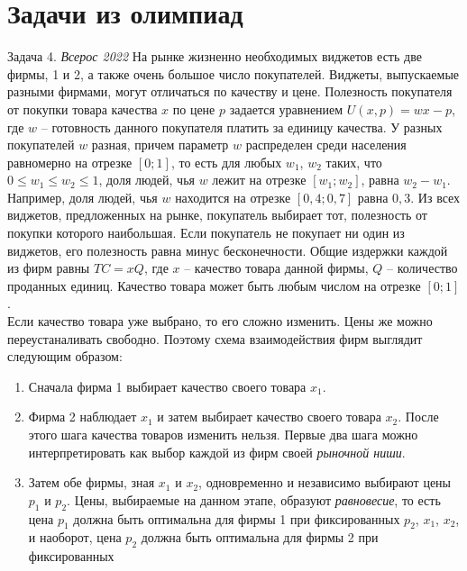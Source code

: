 \section{Задачи из олимпиад}

\begin{mybox}{Задача 4. \textit{Всерос 2022}}
    \indent\setlength{\parindent}{1em}\indent\setlength{\parindent}{1em}На рынке жизненно необходимых виджетов есть две
    фирмы, 1 и 2, а также очень большое число покупателей. Виджеты, выпускаемые разными фирмами, могут отличаться по
    качеству и цене. Полезность покупателя от покупки товара качества $x$ по цене $p$ задается уравнением
    $U(x,p)=wx-p$, где $w$ – готовность данного покупателя платить за единицу качества. У разных покупателей $w$
    разная, причем параметр $w$ распределен среди населения равномерно на отрезке $[0; 1]$, то есть для любых $w_1$,
    $w_2$ таких, что $0\leq w_1 \leq w_2 \leq 1$, доля людей, чья $w$ лежит на отрезке $[w_1;w_2]$, равна $w_2 - w_1$.
    Например, доля людей, чья $w$ находится на отрезке $[0,4; 0,7]$ равна $0,3$. Из всех виджетов, предложенных на
    рынке, покупатель выбирает тот, полезность от покупки которого наибольшая. Если покупатель не покупает ни один из
    виджетов, его полезность равна минус бесконечности. Общие издержки каждой из фирм равны $TC=xQ$, где $x$ – качество
    товара данной фирмы, $Q$ – количество проданных единиц. Качество товара может быть любым числом на отрезке $[0; 1]$.\\
    \indent\setlength{\parindent}{1em}\indent\setlength{\parindent}{1em}Если качество товара уже выбрано, то его сложно
    изменить. Цены же можно переустаналивать свободно. Поэтому схема взаимодействия фирм выглядит следующим образом:
    \begin{enumerate}
        \item Сначала фирма 1 выбирает качество своего товара $x_1$.
        \item Фирма 2 наблюдает $x_1$ и затем выбирает качество своего товара $x_2$. После этого шага качества товаров
        изменить нельзя. Первые два шага можно интерпретировать как выбор каждой из фирм своей \textit{рыночной ниши}.
        \item Затем обе фирмы, зная $x_1$ и $x_2$, одновременно и независимо выбирают цены $p_1$ и $p_2$. Цены,
        выбираемые на данном этапе, образуют \textit{равновесие}, то есть цена $p_1$ должна быть оптимальна для фирмы 1 при
        фиксированных $p_2$, $x_1$, $x_2$, и наоборот, цена $p_2$ должна быть оптимальна для фирмы 2 при фиксированных

\end{enumerate}
\end{mybox}
